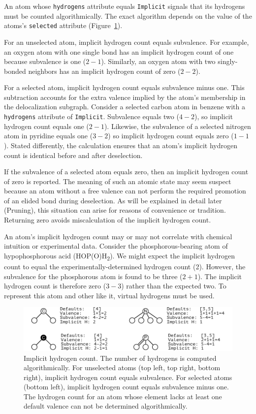 \documentclass{article}
\def\ttt{\texttt}
\begin{document}
An atom whose \ttt{hydrogens} attribute equals \ttt{Implicit} signals that its hydrogens must be counted algorithmically. The exact algorithm depends on the value of the atoms's \ttt{selected} attribute (Figure~\ref{fig:implicit-hydrogen-count}).

For an unselected atom, implicit hydrogen count equals subvalence. For example, an oxygen atom with one single bond has an implicit hydrogen count of one because subvalence is one ($2 - 1$). Similarly, an oxygen atom with two singly-bonded neighbors has an implicit hydrogen count of zero ($2 - 2$).

For a selected atom, implicit hydrogen count equals subvalence minus one. This subtraction accounts for the extra valence implied by the atom's membership in the delocalization subgraph. Consider a selected carbon atom in benzene with a \ttt{hydrogens} attribute of \ttt{Implicit}. Subvalence equals two ($4 - 2$), so implicit hydrogen count equals one ($2 - 1$). Likewise, the subvalence of a selected nitrogen atom in pyridine equals one ($3 - 2$) so implicit hydrogen count equals zero ($1 - 1$). Stated differently, the calculation ensures that an atom's implicit hydrogen count is identical before and after deselection.

If the subvalence of a selected atom equals zero, then an implicit hydrogen count of zero is reported. The meaning of such an atomic state may seem suspect because an atom without a free valence can not perform the required promotion of an elided bond during deselection. As will be explained in detail later (Pruning), this situation can arise for reasons of convenience or tradition. Returning zero avoids miscalculation of the implicit hydrogen count.

An atom's implicit hydrogen count may or may not correlate with chemical intuition or experimental data. Consider the phosphorous-bearing atom of hypophosphorous acid (HOP(O)H\textsubscript{2}). We might expect the implicit hydrogen count to equal the experimentally-determined hydrogen count (2). However, the subvalence for the phosphorous atom is found to be three ($2 + 1$). The implicit hydrogen count is therefore zero ($3 - 3$) rather than the expected two. To represent this atom and other like it, virtual hydrogens must be used.

\begin{figure}
    \centering
    \includegraphics[width=\columnwidth]{implicit-hydrogen-count.pdf}
    \caption{Implicit hydrogen count. The number of hydrogens is computed algorithmically. For unselected atoms (top left, top right, bottom right), implicit hydrogen count equals subvalence. For selected atoms (bottom left), implicit hydrogen count equals subvalence minus one. The hydrogen count for an atom whose element lacks at least one default valence can not be determined algorithmically.}
    \label{fig:implicit-hydrogen-count}
\end{figure}
\end{document}
